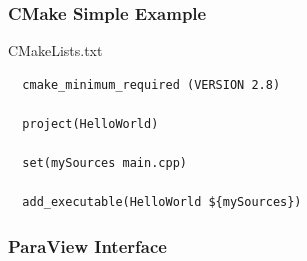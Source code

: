 \begin{frame}[fragile]
  \frametitle{CMake Simple Example}

  \begin{block}{CMakeLists.txt}
\begin{verbatim}
  cmake_minimum_required (VERSION 2.8)

  project(HelloWorld)

  set(mySources main.cpp)

  add_executable(HelloWorld ${mySources})

\end{verbatim}
  \end{block}
\end{frame}

\begin{frame}
  \frametitle{ParaView Interface}


\end{frame}

